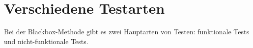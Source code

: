 \section{Verschiedene Testarten}

Bei der Blackbox-Methode gibt es zwei Hauptarten von
Testen: funktionale Tests und nicht-funktionale Tests.



